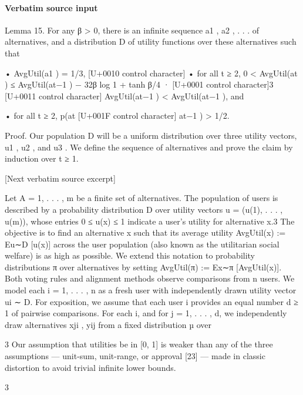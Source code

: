 \documentclass[10pt]{article}
\begin{document}
\paragraph{Verbatim source input}
\begin{ReviewVerbatim}
Lemma 15. For any β > 0, there is an infinite sequence a1 , a2 , . . . of alternatives, and a distribution
  D of utility functions over these alternatives such that

                • AvgUtil(a1 ) = 1/3,
                                                                            [U+0010 control character]
                • for all t ≥ 2, 0 < AvgUtil(at ) ≤ AvgUtil(at−1 ) − 32β log 1 + tanh β/4 ·
                                [U+0001 control character]3 [U+0011 control character]
                  AvgUtil(at−1 )     < AvgUtil(at−1 ), and

                • for all t ≥ 2, p(at [U+001F control character] at−1 ) > 1/2.

  Proof. Our population D will be a uniform distribution over three utility vectors, u1 , u2 , and u3 . We
  define the sequence of alternatives and prove the claim by induction over t ≥ 1.

[Next verbatim source excerpt]

Let A = {1, . . . , m} be a finite set of alternatives. The population of users is described by a
probability distribution D over utility vectors u = (u(1), . . . , u(m)), whose entries 0 ≤ u(x) ≤ 1
indicate a user’s utility for alternative x.3 The objective is to find an alternative x such that its average
utility AvgUtil(x) := Eu∼D [u(x)] across the user population (also known as the utilitarian social
welfare) is as high as possible. We extend this notation to probability distributions π over alternatives
by setting AvgUtil(π) := Ex∼π [AvgUtil(x)].
Both voting rules and alignment methods observe comparisons from n users. We model each
i = 1, . . . , n as a fresh user with independently drawn utility vector ui ∼ D. For exposition, we
assume that each user i provides an equal number d ≥ 1 of pairwise comparisons. For each i,
and for j = 1, . . . , d, we independently draw alternatives xji , yij from a fixed distribution µ over

    3
     Our assumption that utilities be in [0, 1] is weaker than any of the three assumptions — unit-sum, unit-range,
or approval [23] — made in classic distortion to avoid trivial infinite lower bounds.


                                                           3


\end{ReviewVerbatim}
\end{document}
